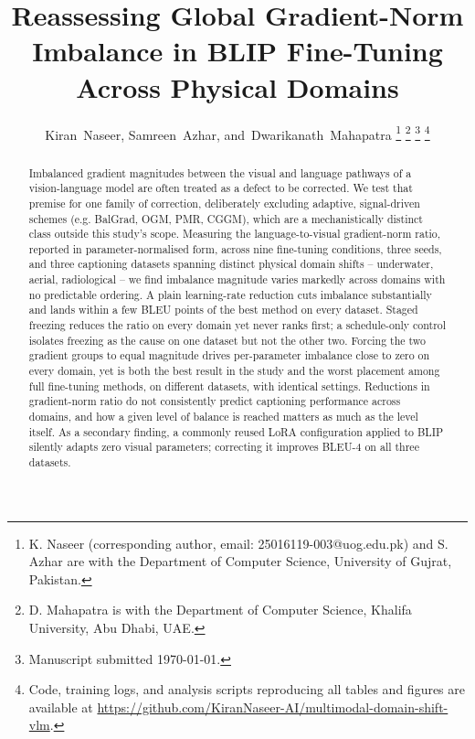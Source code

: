 \documentclass[journal]{IEEEtran}
\begin{document}
\title{Reassessing Global Gradient-Norm Imbalance in BLIP Fine-Tuning Across Physical Domains}

\author{Kiran~Naseer,
        Samreen~Azhar,
        and~Dwarikanath~Mahapatra%
\thanks{K. Naseer (corresponding author, email:
25016119-003@uog.edu.pk) and S. Azhar are with the Department of
Computer Science, University of Gujrat, Pakistan.}%
\thanks{D. Mahapatra is with the Department of Computer Science,
Khalifa University, Abu Dhabi, UAE.}%
\thanks{Manuscript submitted \today.}%
\thanks{Code, training logs, and analysis scripts reproducing all
tables and figures are available at
\url{https://github.com/KiranNaseer-AI/multimodal-domain-shift-vlm}.}}

\maketitle

\begin{abstract}
Imbalanced gradient magnitudes between the visual and language
pathways of a vision-language model are often treated as a defect
to be corrected. We test that premise for one family of correction, deliberately excluding adaptive, signal-driven schemes (e.g. BalGrad, OGM, PMR, CGGM), which are a mechanistically distinct class outside this study's
scope. Measuring the language-to-visual gradient-norm ratio,
reported in parameter-normalised form, across nine fine-tuning
conditions, three seeds, and three captioning datasets spanning
distinct physical domain shifts -- underwater, aerial, radiological -- we find imbalance magnitude varies markedly across domains with no predictable ordering. A plain learning-rate reduction cuts imbalance substantially and lands within a few BLEU points of the best method on every dataset.
Staged freezing reduces the ratio on every domain yet never ranks
first; a schedule-only control isolates freezing as the cause on
one dataset but not the other two. Forcing the two gradient groups
to equal magnitude drives per-parameter imbalance close to zero on
every domain, yet is both the best result in the study and the
worst placement among full fine-tuning methods, on different
datasets, with identical settings. Reductions in gradient-norm
ratio do not consistently predict captioning performance across
domains, and how a given level of balance is reached matters as
much as the level itself. As a secondary finding, a commonly reused LoRA configuration applied to BLIP silently adapts zero visual parameters; correcting it improves BLEU-4 on all three datasets.
\end{abstract}
\end{document}
